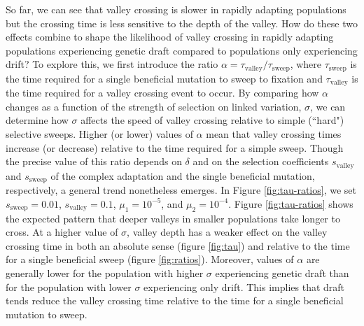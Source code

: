 \documentclass[10pt,twocolumn,twoside]{gsajnl}
\begin{document}
\begin{spacing}{1.5}
So far, we can see that valley crossing is slower in rapidly adapting populations but the crossing time is less sensitive to the depth of the valley.
How do these two effects combine to shape the likelihood of valley crossing in rapidly adapting populations experiencing genetic draft compared to populations only experiencing drift?
To explore this, we first introduce the ratio $\alpha = \tau_{\mathrm{valley}}/\tau_{\mathrm{sweep}}$, where $\tau_{\mathrm{sweep}}$ is the time required for a single beneficial mutation to sweep to fixation and $\tau_{\mathrm{valley}}$ is the time required for a valley crossing event to occur.
By comparing how $\alpha$ changes as a function of the strength of selection on linked variation, $\sigma$, we can determine how $\sigma$ affects the speed of valley crossing relative to simple (``hard") selective sweeps. Higher (or lower) values of $\alpha$ mean that valley crossing times increase (or decrease) relative to the time required for a simple sweep.
Though the precise value of this ratio depends on $\delta$ and on the selection coefficients $s_{\mathrm{valley}}$ and $s_{\mathrm{sweep}}$ of the complex adaptation and the single beneficial mutation, respectively, a general trend nonetheless emerges.
In Figure \ref{fig:tau-ratios}, we set $s_{\mathrm{sweep}} = 0.01$, $s_{\mathrm{valley}} = 0.1$, $\mu_1 = 10^{-5}$, and $\mu_2 = 10^{-4}$.
Figure \ref{fig:tau-ratios} shows the expected pattern that deeper valleys in smaller populations take longer to cross.
At a higher value of $\sigma$, valley depth has a weaker effect on the valley crossing time in both an absolute sense (figure \ref{fig:tau}) and relative to the time for a single beneficial sweep (figure \ref{fig:ratios}).
Moreover, values of $\alpha$ are generally lower for the population with higher $\sigma$ experiencing genetic draft than for the population with lower $\sigma$ experiencing only drift.
This implies that draft tends reduce the valley crossing time relative to the time for a single beneficial mutation to sweep.


\end{spacing}
\end{document}
